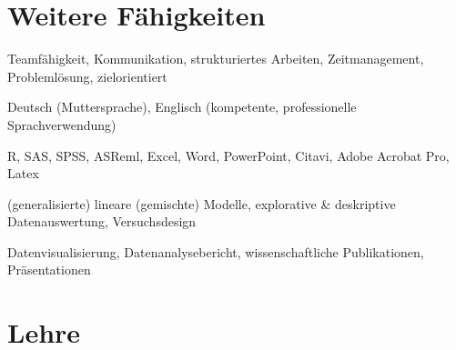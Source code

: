 \documentclass[11pt, a4paper]{awesome-cv}
\begin{document}
\hypertarget{weitere-fuxe4higkeiten}{%
\section{Weitere Fähigkeiten}\label{weitere-fuxe4higkeiten}}

\begin{cvskills}

  {Teamfähigkeit, Kommunikation, strukturiertes Arbeiten, Zeitmanagement, Problemlösung, zielorientiert} 
  
  {Deutsch (Muttersprache), Englisch (kompetente, professionelle Sprachverwendung)}
  
  {R, SAS, SPSS, ASReml, Excel, Word, PowerPoint, Citavi, Adobe Acrobat Pro, Latex} 
  
  {(generalisierte) lineare (gemischte) Modelle, explorative \& deskriptive Datenauswertung, Versuchsdesign} 
  
  {Datenvisualisierung, Datenanalysebericht, wissenschaftliche Publikationen, Präsentationen} 
  

\end{cvskills}

\hypertarget{lehre}{%
\section{Lehre}\label{lehre}}
\end{document}
